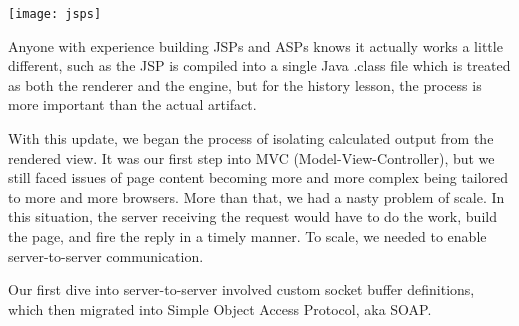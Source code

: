 \texttt{[image: jsps]}

Anyone with experience building JSPs and ASPs knows it actually works a little different, such as the JSP is compiled into a single Java .class file which is treated as both the renderer and the engine, but for the history lesson, the process is more important than the actual artifact.

With this update, we began the process of isolating calculated output from the rendered view.  It was our first step into MVC (Model-View-Controller), but we still faced issues of page content becoming more and more complex being tailored to more and more browsers.  More than that, we had a nasty problem of scale.  In this situation, the server receiving the request would have to do the work, build the page, and fire the reply in a timely manner.  To scale, we needed to enable server-to-server communication.

Our first dive into server-to-server involved custom socket buffer definitions, which then migrated into Simple Object Access Protocol, aka SOAP.

